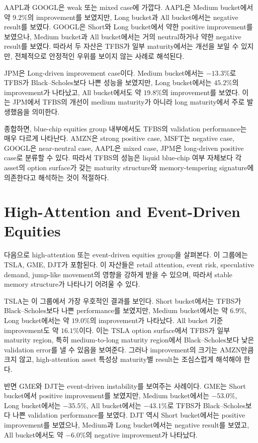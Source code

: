 \documentclass[11pt,a4paper]{report}
\begin{document}
AAPL과 GOOGL은 weak 또는 mixed case에 가깝다. AAPL은 Medium bucket에서 약 $9.2\%$의 improvement를 보였지만, Long bucket과 All bucket에서는 negative result를 보였다. GOOGL은 Short와 Long bucket에서 약한 positive improvement를 보였으나, Medium bucket과 All bucket에서는 거의 neutral하거나 약한 negative result를 보였다. 따라서 두 자산은 TFBS가 일부 maturity에서는 개선을 보일 수 있지만, 전체적으로 안정적인 우위를 보이지 않는 사례로 해석된다.

JPM은 Long-driven improvement case이다. Medium bucket에서는 $-13.3\%$로 TFBS가 Black--Scholes보다 나쁜 성능을 보였지만, Long bucket에서는 $45.2\%$의 improvement가 나타났고, All bucket에서도 약 $19.8\%$의 improvement를 보였다. 이는 JPM에서 TFBS의 개선이 medium maturity가 아니라 long maturity에서 주로 발생했음을 의미한다.

종합하면, blue-chip equities group 내부에서도 TFBS의 validation performance는 매우 다르게 나타난다. AMZN은 strong positive case, MSFT는 negative case, GOOGL은 near-neutral case, AAPL은 mixed case, JPM은 long-driven positive case로 분류할 수 있다. 따라서 TFBS의 성능은 liquid blue-chip 여부 자체보다 각 asset의 option surface가 갖는 maturity structure와 memory-tempering signature에 의존한다고 해석하는 것이 적절하다.

\section{High-Attention and Event-Driven Equities}

다음으로 high-attention 또는 event-driven equities group을 살펴본다. 이 그룹에는 TSLA, GME, DJT가 포함된다. 이 자산들은 retail attention, event risk, speculative demand, jump-like movement의 영향을 강하게 받을 수 있으며, 따라서 stable memory structure가 나타나기 어려울 수 있다.

TSLA는 이 그룹에서 가장 우호적인 결과를 보인다. Short bucket에서는 TFBS가 Black--Scholes보다 나쁜 performance를 보였지만, Medium bucket에서는 약 $6.9\%$, Long bucket에서는 약 $19.0\%$의 improvement가 나타났다. All bucket 기준 improvement도 약 $16.1\%$이다. 이는 TSLA option surface에서 TFBS가 일부 maturity region, 특히 medium-to-long maturity region에서 Black--Scholes보다 낮은 validation error를 낼 수 있음을 보여준다. 그러나 improvement의 크기는 AMZN만큼 크지 않고, high-attention asset 특성상 maturity별 result는 조심스럽게 해석해야 한다.

반면 GME와 DJT는 event-driven instability를 보여주는 사례이다. GME는 Short bucket에서 positive improvement를 보였지만, Medium bucket에서는 $-53.0\%$, Long bucket에서는 $-35.5\%$, All bucket에서는 $-43.1\%$로 TFBS가 Black--Scholes보다 나쁜 validation performance를 보였다. DJT 역시 Short bucket에서는 positive improvement를 보였으나, Medium과 Long bucket에서는 negative result를 보였고, All bucket에서도 약 $-6.0\%$의 negative improvement가 나타났다.
\end{document}
